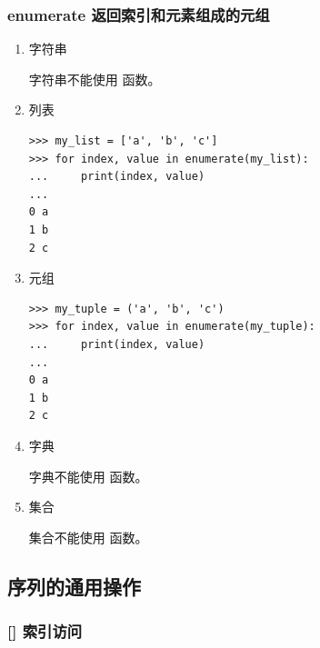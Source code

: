 \subsubsection{enumerate 返回索引和元素组成的元组}
\begin{enumerate}[label=\arabic*)]
    \item 字符串

    字符串不能使用  函数。

    \item 列表
\begin{lstlisting}[style=demostyle,numbers=none]
>>> my_list = ['a', 'b', 'c']
>>> for index, value in enumerate(my_list):
...     print(index, value)
...
0 a
1 b
2 c
\end{lstlisting}

    \item 元组
\begin{lstlisting}[style=demostyle,numbers=none]
>>> my_tuple = ('a', 'b', 'c')
>>> for index, value in enumerate(my_tuple):
...     print(index, value)
...
0 a
1 b
2 c
\end{lstlisting}

    \item 字典

    字典不能使用  函数。

    \item 集合

    集合不能使用  函数。
\end{enumerate}


\subsection{序列的通用操作}

\subsubsection{[] 索引访问}

